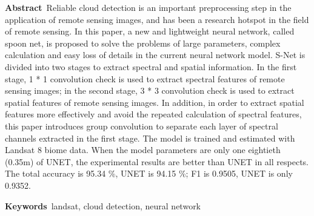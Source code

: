 \documentclass[10pt]{ctexart}
\begin{document}
\noindent\textbf{Abstract}\ Reliable cloud detection is an important preprocessing step in the application of remote sensing images, and has been a research hotspot in the field of remote sensing. In this paper, a new and lightweight neural network, called spoon net, is proposed to solve the problems of large parameters, complex calculation and easy loss of details in the current neural network model. S-Net is divided into two stages to extract spectral and spatial information. In the first stage, 1 * 1 convolution check is used to extract spectral features of remote sensing images; in the second stage, 3 * 3 convolution check is used to extract spatial features of remote sensing images. In addition, in order to extract spatial features more effectively and avoid the repeated calculation of spectral features, this paper introduces group convolution to separate each layer of spectral channels extracted in the first stage. The model is trained and estimated with Landsat 8 biome data. When the model parameters are only one eightieth (0.35m) of UNET, the experimental results are better than UNET in all respects. The total accuracy is 95.34 \%, UNET is 94.15 \%; F1 is 0.9505, UNET is only 0.9352.

\noindent\textbf{Keywords}\ landsat, cloud detection, neural network
\end{document}
